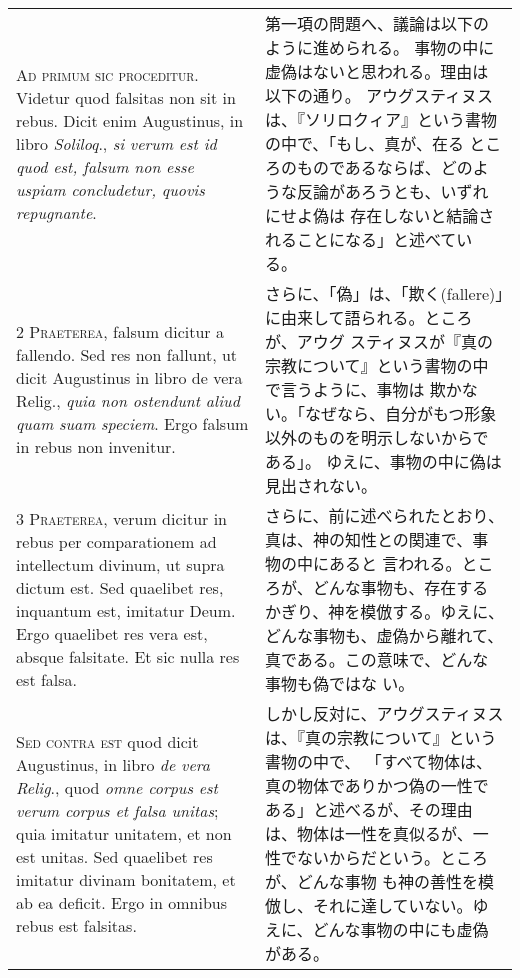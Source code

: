 \documentclass[10pt]{jsarticle} %
\begin{document}
\begin{longtable}{p{21em}p{21em}}

{\huge A}{\scshape d primum sic proceditur}. Videtur quod falsitas non
sit in rebus. Dicit enim Augustinus, in libro {\itshape Soliloq}.,
{\itshape si verum est id quod est, falsum non esse uspiam concludetur,
quovis repugnante}.

&
第一項の問題へ、議論は以下のように進められる。
事物の中に虚偽はないと思われる。理由は以下の通り。
アウグスティヌスは、『ソリロクィア』という書物の中で、「もし、真が、在る
 ところのものであるならば、どのような反論があろうとも、いずれにせよ偽は
 存在しないと結論されることになる」と述べている。

\\


{\scshape 2 Praeterea}, falsum dicitur a fallendo. Sed
res non fallunt, ut dicit Augustinus in libro de vera Relig., {\itshape quia non
ostendunt aliud quam suam speciem}. Ergo falsum in rebus non invenitur.

&

さらに、「偽」は、「欺く(fallere)」に由来して語られる。ところが、アウグ
 スティヌスが『真の宗教について』という書物の中で言うように、事物は
 欺かない。「なぜなら、自分がもつ形象以外のものを明示しないからである」。
 ゆえに、事物の中に偽は見出されない。

\\


{\scshape 3 Praeterea}, verum dicitur in rebus per
comparationem ad intellectum divinum, ut supra dictum est. Sed quaelibet
res, inquantum est, imitatur Deum. Ergo quaelibet res vera est, absque
falsitate. Et sic nulla res est falsa.

&

さらに、前に述べられたとおり、真は、神の知性との関連で、事物の中にあると
 言われる。ところが、どんな事物も、存在するかぎり、神を模倣する。ゆえに、
 どんな事物も、虚偽から離れて、真である。この意味で、どんな事物も偽ではな
 い。

\\


{\scshape Sed contra est} quod dicit Augustinus, in libro {\itshape de
vera Relig}., quod {\itshape omne corpus est verum corpus et falsa
unitas}; quia imitatur unitatem, et non est unitas. Sed quaelibet res
imitatur divinam bonitatem, et ab ea deficit. Ergo in omnibus rebus est
falsitas.

&
しかし反対に、アウグスティヌスは、『真の宗教について』という書物の中で、
 「すべて物体は、真の物体でありかつ偽の一性である」と述べるが、その理由
 は、物体は一性を真似るが、一性でないからだという。ところが、どんな事物
 も神の善性を模倣し、それに達していない。ゆえに、どんな事物の中にも虚偽
 がある。


\end{longtable}
\end{document}
